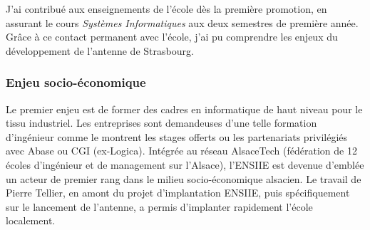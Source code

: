 \documentclass[11pt]{article}
\begin{document}
J'ai contribué aux enseignements de l'école dès la première promotion,
en assurant le cours \emph{Systèmes Informatiques} aux deux semestres
de première année. Grâce à ce contact permanent avec l'école, j'ai pu
comprendre les enjeux du développement de l'antenne de Strasbourg.

\subsubsection*{Enjeu socio-économique}
Le premier enjeu est de former des cadres en informatique de haut niveau pour le
tissu  industriel.  Les  entreprises  sont  demandeuses  d'une  telle  formation
d'ingénieur comme le montrent les stages offerts ou les partenariats privilégiés
avec Abase ou  CGI (ex-Logica). Intégrée au réseau AlsaceTech  (fédération de 12
écoles d'ingénieur et de management sur l'Alsace), l'ENSIIE est devenue d'emblée
un acteur de  premier rang dans le milieu socio-économique  alsacien. Le travail
de Pierre Tellier, en amont du projet d'implantation ENSIIE, puis spécifiquement
sur  le  lancement  de  l'antenne,   a  permis  d'implanter  rapidement  l'école
localement.
\end{document}
